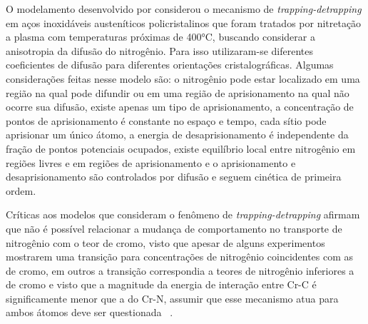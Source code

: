 \documentclass[]{politex}
\begin{document}
	O modelamento desenvolvido por \cite{moskalioviene2011modeling} considerou o mecanismo de \textit{trapping-detrapping} em aços inoxidáveis austeníticos policristalinos que foram tratados por nitretação a plasma com temperaturas próximas de 400°C, buscando considerar a anisotropia da difusão do nitrogênio. Para isso utilizaram-se diferentes coeficientes de difusão para diferentes orientações cristalográficas. Algumas considerações feitas nesse modelo são: o nitrogênio pode estar localizado em uma região na qual pode difundir ou em uma região de aprisionamento na qual não ocorre sua difusão, existe apenas um tipo de aprisionamento, a concentração de pontos de aprisionamento é constante no espaço e tempo, cada sítio pode aprisionar um único átomo, a energia de desaprisionamento é independente da fração de pontos potenciais ocupados, existe equilíbrio local entre nitrogênio em regiões livres e em regiões de aprisionamento e o aprisionamento e desaprisionamento são controlados por difusão e seguem cinética de primeira ordem.\par
	Críticas aos modelos que consideram o fenômeno de \textit{trapping-detrapping} afirmam que não é possível relacionar a mudança de comportamento no transporte de nitrogênio com o teor de cromo, visto que apesar de alguns experimentos mostrarem uma transição para concentrações de nitrogênio coincidentes com as de cromo, em outros a transição correspondia a teores de nitrogênio inferiores a de cromo e visto que a magnitude da energia de interação entre Cr-C é significamente menor que a do Cr-N, assumir que esse mecanismo atua para ambos átomos deve ser questionada ~\cite{mandl2002concentration}.
	
\end{document}
